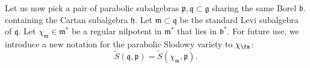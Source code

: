 \documentclass[12pt]{amsart}
\begin{document}
Let us now pick a pair of parabolic subalgebras $\mathfrak{p}, \mathfrak{q} \subset \mathfrak{g}$ sharing the same Borel $\mathfrak{b}$. containing the Cartan subalgebra $\mathfrak{h}$. Let $\mathfrak{m} \subset \mathfrak{q}$ be the standard Levi subalgebra of $\mathfrak{q}$. Let $\chi_{\mathfrak{m}} \in \mathfrak{m}^*$ be a regular nilpotent in $\mathfrak{m}^*$ that lies in $\mathfrak{b}^*$. For future use, we introduce a new notation for the parabolic Slodowy variety to $\chi_{\fm}$: 
\begin{equation*}
\widetilde{S}(\mathfrak{q},\mathfrak{p})=\widetilde{S}(\chi_{\mathfrak{m}},\mathfrak{p}).
\end{equation*}



    
   






\end{document}

